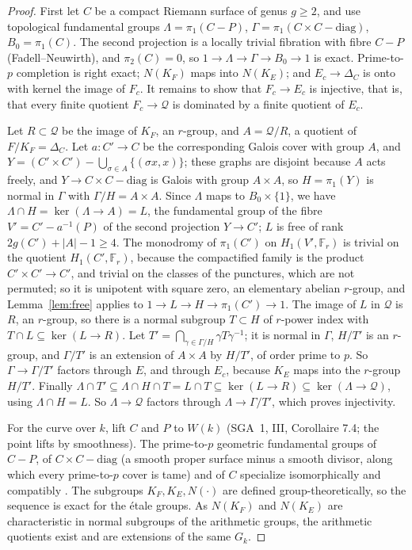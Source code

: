 \documentclass[11pt]{amsart}
\theoremstyle{remark}
\newcommand{\F}{\mathbb F}
\begin{document}
\begin{proof}
First let $C$ be a compact Riemann surface of genus $g\ge2$, and use topological fundamental groups $\Lambda=\pi_1(C-P)$, $\Gamma=\pi_1(C\times C-\mathrm{diag})$, $B_0=\pi_1(C)$. The second projection is a locally trivial fibration with fibre $C-P$ (Fadell--Neuwirth), and $\pi_2(C)=0$, so $1\to\Lambda\to\Gamma\to B_0\to1$ is exact. Prime-to-$p$ completion is right exact; $N(K_F)$ maps into $N(K_E)$; and $E_c\to\Delta_C$ is onto with kernel the image of $F_c$. It remains to show that $F_c\to E_c$ is injective, that is, that every finite quotient $F_c\to\mathcal Q$ is dominated by a finite quotient of $E_c$.

Let $R\subset\mathcal Q$ be the image of $K_F$, an $r$-group, and $A=\mathcal Q/R$, a quotient of $F/K_F=\Delta_C$. Let $a\colon C'\to C$ be the corresponding Galois cover with group $A$, and $Y=(C'\times C')-\bigcup_{\sigma\in A}\{(\sigma x,x)\}$; these graphs are disjoint because $A$ acts freely, and $Y\to C\times C-\mathrm{diag}$ is Galois with group $A\times A$, so $H=\pi_1(Y)$ is normal in $\Gamma$ with $\Gamma/H=A\times A$. Since $\Lambda$ maps to $B_0\times\{1\}$, we have $\Lambda\cap H=\ker(\Lambda\to A)=L$, the fundamental group of the fibre $V'=C'-a^{-1}(P)$ of the second projection $Y\to C'$; $L$ is free of rank $2g(C')+|A|-1\ge4$. The monodromy of $\pi_1(C')$ on $H_1(V',\F_r)$ is trivial on the quotient $H_1(C',\F_r)$, because the compactified family is the product $C'\times C'\to C'$, and trivial on the classes of the punctures, which are not permuted; so it is unipotent with square zero, an elementary abelian $r$-group, and Lemma~\ref{lem:free} applies to $1\to L\to H\to\pi_1(C')\to1$. The image of $L$ in $\mathcal Q$ is $R$, an $r$-group, so there is a normal subgroup $T\subset H$ of $r$-power index with $T\cap L\subseteq\ker(L\to R)$. Let $T'=\bigcap_{\gamma\in\Gamma/H}\gamma T\gamma^{-1}$; it is normal in $\Gamma$, $H/T'$ is an $r$-group, and $\Gamma/T'$ is an extension of $A\times A$ by $H/T'$, of order prime to $p$. So $\Gamma\to\Gamma/T'$ factors through $E$, and through $E_c$, because $K_E$ maps into the $r$-group $H/T'$. Finally $\Lambda\cap T'\subseteq\Lambda\cap H\cap T=L\cap T\subseteq\ker(L\to R)\subseteq\ker(\Lambda\to\mathcal Q)$, using $\Lambda\cap H=L$. So $\Lambda\to\mathcal Q$ factors through $\Lambda\to\Gamma/T'$, which proves injectivity.

For the curve over $k$, lift $C$ and $P$ to $W(k)$ (SGA~1, III, Corollaire 7.4; the point lifts by smoothness). The prime-to-$p$ geometric fundamental groups of $C-P$, of $C\times C-\mathrm{diag}$ (a smooth proper surface minus a smooth divisor, along which every prime-to-$p$ cover is tame) and of $C$ specialize isomorphically and compatibly \cite[XIII, Corollaire 2.9, \S2.10, Lemme 2.11]{SGA1}. The subgroups $K_F,K_E,N(\cdot)$ are defined group-theoretically, so the sequence is exact for the \'etale groups. As $N(K_F)$ and $N(K_E)$ are characteristic in normal subgroups of the arithmetic groups, the arithmetic quotients exist and are extensions of the same $G_k$.
\end{proof}
\end{document}

